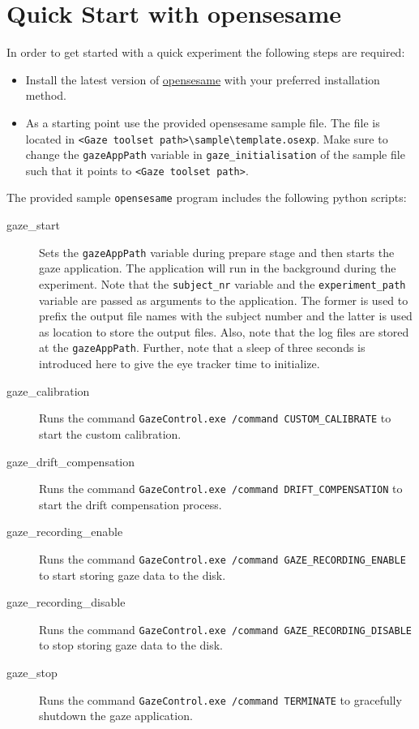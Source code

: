 \documentclass[a4paper,oneside]{book}
\begin{document}
\section{Quick Start with opensesame}
\label{sec.quick.opensesame}
In order to get started with a quick experiment the following steps are required:
\begin{itemize}
    \item Install the latest version of \href{https://osdoc.cogsci.nl/3.3/download/}{opensesame} with your preferred installation method.
    \item As a starting point use the provided opensesame sample file.
        The file is located in \texttt{<Gaze toolset path>\textbackslash sample\textbackslash template.osexp}.
        Make sure to change the \texttt{gazeAppPath} variable in \texttt{gaze\_initialisation} of the sample file such that it points to \texttt{<Gaze toolset path>}.
\end{itemize}

The provided sample \texttt{opensesame} program includes the following python scripts:
\begin{description}
    \item[gaze\_start]
        Sets the \texttt{gazeAppPath} variable during prepare stage and then starts the gaze application.
        The application will run in the background during the experiment.
        Note that the \texttt{subject\_nr} variable and the \texttt{experiment\_path} variable are passed as arguments to the application.
        The former is used to prefix the output file names with the subject number and the latter is used as location to store the output files.
        Also, note that the log files are stored at the \texttt{gazeAppPath}.
        Further, note that a sleep of three seconds is introduced here to give the eye tracker time to initialize.
    \item[gaze\_calibration]
        Runs the command \texttt{GazeControl.exe /command CUSTOM\_CALIBRATE} to start the custom calibration.
    \item[gaze\_drift\_compensation]
        Runs the command \texttt{GazeControl.exe /command DRIFT\_COMPENSATION} to start the drift compensation process.
    \item[gaze\_recording\_enable]
        Runs the command \texttt{GazeControl.exe /command GAZE\_RECORDING\_ENABLE} to start storing gaze data to the disk.
    \item[gaze\_recording\_disable]
        Runs the command \texttt{GazeControl.exe /command GAZE\_RECORDING\_DISABLE} to stop storing gaze data to the disk.
    \item[gaze\_stop]
        Runs the command \texttt{GazeControl.exe /command TERMINATE} to gracefully shutdown the gaze application.
\end{description}
\end{document}
